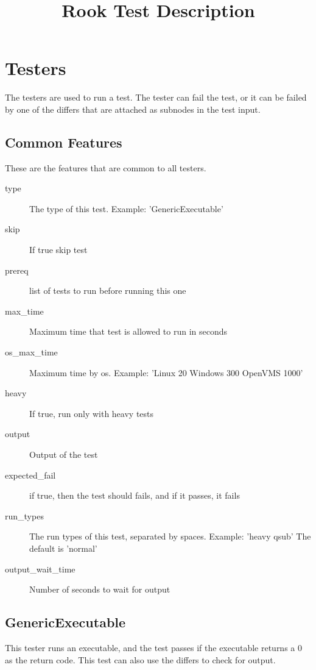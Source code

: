 \documentclass{article}
\title{Rook Test Description}
\begin{document}
\maketitle

\section{Testers}

The testers are used to run a test.  The tester can fail the test, or
it can be failed by one of the differs that are attached as subnodes
in the test input.

\subsection{Common Features}

These are the features that are common to all testers.

\begin{description}
  \item[type] The type of this test. Example: 'GenericExecutable'
  \item[skip] If true skip test
  \item[prereq] list of tests to run before running this one
  \item[max\_time] Maximum time that test is allowed to run in seconds
  \item[os\_max\_time] Maximum time by os. Example: 'Linux 20 Windows 300 OpenVMS 1000'
  \item[heavy] If true, run only with heavy tests
  \item[output] Output of the test
  \item[expected\_fail] if true, then the test should fails, and if it passes, it fails
  \item[run\_types] The run types of this test, separated by spaces. Example: 'heavy qsub' The default is 'normal'
  \item[output\_wait\_time] Number of seconds to wait for output
\end{description}

\subsection{GenericExecutable}

This tester runs an executable, and the test passes if the executable
returns a 0 as the return code.  This test can also use the differs to
check for output.
\end{document}
